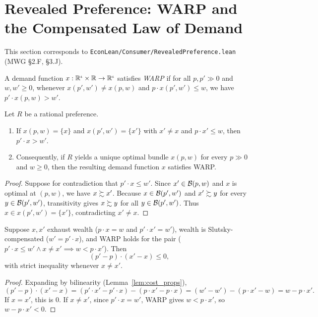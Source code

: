 \section{Revealed Preference: WARP and the Compensated Law of Demand}
\label{sec:revealed}

This section corresponds to \texttt{EconLean/Consumer/RevealedPreference.lean}
(MWG \S2.F, \S3.J).

\begin{definition}
\label{def:warp}
\leanok
{}
A demand function $x : \mathbb{R}^\iota \times \mathbb{R} \to \mathbb{R}^\iota$ satisfies \emph{WARP} if for all
$p, p' \gg 0$ and $w, w' \ge 0$, whenever $x(p', w') \ne x(p, w)$ and
$p \cdot x(p', w') \le w$, we have $p' \cdot x(p, w) > w'$.
\end{definition}

\begin{theorem}
\label{thm:warp_of_rational}
\leanok
{}
Let $R$ be a rational preference.
\begin{enumerate}
  \item If $x(p, w) = \{x\}$ and $x(p', w') = \{x'\}$ with $x' \ne x$ and $p \cdot x' \le w$,
        then $p' \cdot x > w'$.
  \item Consequently, if $R$ yields a unique optimal bundle $x(p, w)$ for every $p \gg 0$
        and $w \ge 0$, then the resulting demand function $x$ satisfies WARP.
\end{enumerate}
\end{theorem}
\begin{proof}
\leanok
Suppose for contradiction that $p' \cdot x \le w'$. Since $x' \in \mathcal{B}(p, w)$ and $x$ is
optimal at $(p, w)$, we have $x \succsim x'$. Because $x \in \mathcal{B}(p', w')$ and $x' \succsim y$ for
every $y \in \mathcal{B}(p', w')$, transitivity gives $x \succsim y$ for all $y \in \mathcal{B}(p', w')$.
Thus $x \in x(p', w') = \{x'\}$, contradicting $x' \ne x$.
\end{proof}

\begin{theorem}
\label{thm:compensated_law}
\leanok
{}
Suppose $x, x'$ exhaust wealth ($p \cdot x = w$ and $p' \cdot x' = w'$), wealth is
Slutsky-compensated ($w' = p' \cdot x$), and WARP holds for the pair
($p' \cdot x \le w' \land x \ne x' \implies w < p \cdot x'$). Then
\[
  (p' - p) \cdot (x' - x) \le 0,
\]
with strict inequality whenever $x \ne x'$.
\end{theorem}
\begin{proof}
\leanok
Expanding by bilinearity (Lemma~\ref{lem:cost_props}),
\[
  (p' - p) \cdot (x' - x) = (p' \cdot x' - p' \cdot x) - (p \cdot x' - p \cdot x)
  = (w' - w') - (p \cdot x' - w) = w - p \cdot x'.
\]
If $x = x'$, this is $0$. If $x \ne x'$, since $p' \cdot x = w'$, WARP gives $w < p \cdot x'$,
so $w - p \cdot x' < 0$.
\end{proof}


